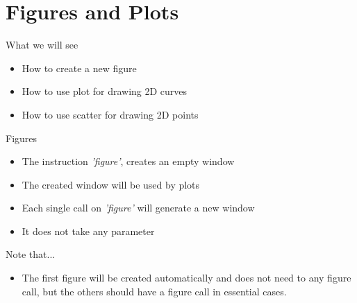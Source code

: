 \documentclass{beamer}
\begin{document}
\section{Figures and Plots}

\begin{frame}{What we will see}
	\begin{block}{}
		\begin{itemize}
			\item How to create  a new figure
			\item How to use plot for drawing 2D curves
			\item How to use scatter for drawing 2D points 
		\end{itemize}
	\end{block}
\end{frame}


\begin{frame}{Figures}
	\begin{block}{}
		\begin{itemize}
			\item The instruction \textit{'figure'}, creates an empty window
			\item The created window will be used by plots
			\item Each single call on \textit{'figure'} will generate a new window
			\item It does not take any parameter
		\end{itemize}
	\end{block}
	\begin{alertblock}{Note that...}
		\begin{itemize}
			\item The first figure will be created automatically and does not need to any figure call, but the others should have a figure call in essential cases.
		\end{itemize}
	\end{alertblock}
\end{frame}
\end{document}
